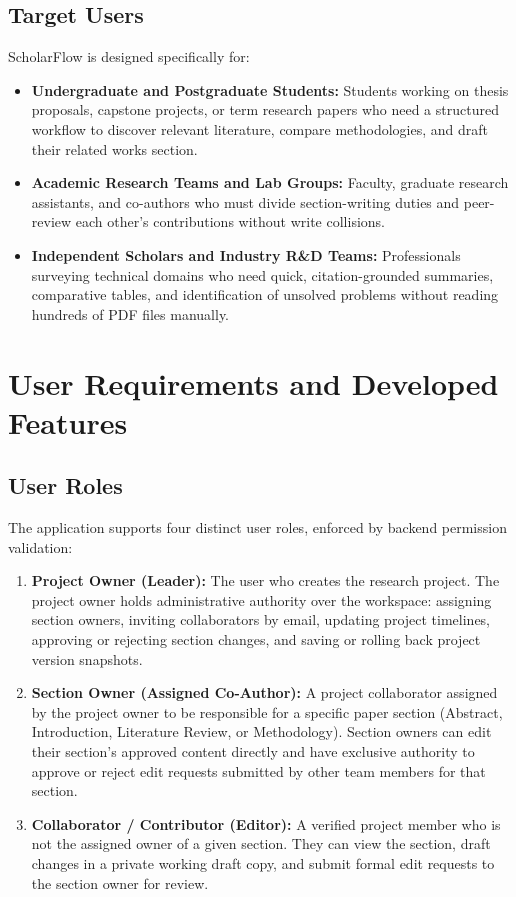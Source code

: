 \documentclass[11pt,a4paper]{article}
\begin{document}
\subsection{Target Users}
ScholarFlow is designed specifically for:
\begin{itemize}
    \item \textbf{Undergraduate and Postgraduate Students:} Students working on thesis proposals, capstone projects, or term research papers who need a structured workflow to discover relevant literature, compare methodologies, and draft their related works section.
    \item \textbf{Academic Research Teams and Lab Groups:} Faculty, graduate research assistants, and co-authors who must divide section-writing duties and peer-review each other's contributions without write collisions.
    \item \textbf{Independent Scholars and Industry R\&D Teams:} Professionals surveying technical domains who need quick, citation-grounded summaries, comparative tables, and identification of unsolved problems without reading hundreds of PDF files manually.
\end{itemize}

\section{User Requirements and Developed Features}

\subsection{User Roles}
The application supports four distinct user roles, enforced by backend permission validation:
\begin{enumerate}
    \item \textbf{Project Owner (Leader):} The user who creates the research project. The project owner holds administrative authority over the workspace: assigning section owners, inviting collaborators by email, updating project timelines, approving or rejecting section changes, and saving or rolling back project version snapshots.
    \item \textbf{Section Owner (Assigned Co-Author):} A project collaborator assigned by the project owner to be responsible for a specific paper section (Abstract, Introduction, Literature Review, or Methodology). Section owners can edit their section's approved content directly and have exclusive authority to approve or reject edit requests submitted by other team members for that section.
    \item \textbf{Collaborator / Contributor (Editor):} A verified project member who is not the assigned owner of a given section. They can view the section, draft changes in a private working draft copy, and submit formal edit requests to the section owner for review.
\end{enumerate}
\end{document}
